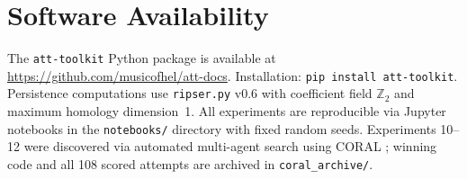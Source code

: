 \documentclass[11pt,a4paper]{article}
\begin{document}
\section{Software Availability}

The \texttt{att-toolkit} Python package is available at \url{https://github.com/musicofhel/att-docs}.
Installation: \texttt{pip install att-toolkit}.
Persistence computations use \texttt{ripser.py} v0.6 \citep{bauer2021ripser} with coefficient field $\mathbb{Z}_2$ and maximum homology dimension~1.
All experiments are reproducible via Jupyter notebooks in the \texttt{notebooks/} directory with fixed random seeds.
Experiments 10--12 were discovered via automated multi-agent search using CORAL \citep{coral2026}; winning code and all 108 scored attempts are archived in \texttt{coral\_archive/}.




\end{document}
